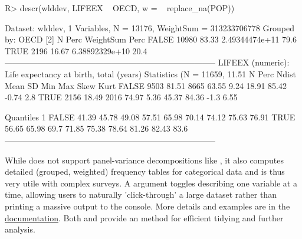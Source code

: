 \documentclass[nojss]{jss} %
\newcommand{\fct}[1]{\code{#1()}}
\begin{document}
%
\begin{Schunk}
\begin{Sinput}
R> descr(wlddev, LIFEEX ~ OECD, w = ~ replace_na(POP))
\end{Sinput}
\begin{Soutput}
Dataset: wlddev, 1 Variables, N = 13176, WeightSum = 313233706778
Grouped by: OECD [2]
           N   Perc       WeightSum  Perc
FALSE  10980  83.33  2.49344474e+11  79.6
TRUE    2196  16.67  6.38892329e+10  20.4
-----------------------------------------------------------------------------
LIFEEX (numeric): Life expectancy at birth, total (years)
Statistics (N = 11659, 11.51% NAs)
          N   Perc  Ndist   Mean    SD    Min    Max   Skew  Kurt
FALSE  9503  81.51   8665  63.55  9.24  18.91  85.42  -0.74   2.8
TRUE   2156  18.49   2016  74.97  5.36  45.37  84.36   -1.3  6.55

Quantiles
          1%     5%    10%    25%    50%    75%    90%    95%    99%
FALSE  41.39  45.78  49.08  57.51  65.98  70.14  74.12  75.63  76.91
TRUE   56.65  65.98   69.7  71.85  75.38  78.64  81.26  82.43   83.6
-----------------------------------------------------------------------------
\end{Soutput}
\end{Schunk}

%
While \fct{descr} does not support panel-variance decompositions like \fct{qsu}, it also computes detailed (grouped, weighted) frequency tables for categorical data and is thus very utile with complex surveys. A  argument toggles describing one variable at a time, allowing users to naturally 'click-through' a large dataset rather than printing a massive output to the console. More details and examples are in the \href{https://sebkrantz.github.io/collapse/reference/descr.html}{documentation}. Both \fct{qsu} and \fct{descr} provide an  method for efficient tidying and further analysis. \newline
\end{document}
